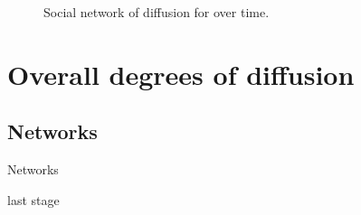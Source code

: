 \documentclass[
  a4paper,
  ]{scrartcl}
\begin{document}
    \subsubsection{}

      \begin{figure}[H]
        \caption{Social network of diffusion for  over time.}
        \centering
      \end{figure}

\section{Overall degrees of diffusion}

  \subsection{Networks}


    Networks

      last stage
\end{document}
